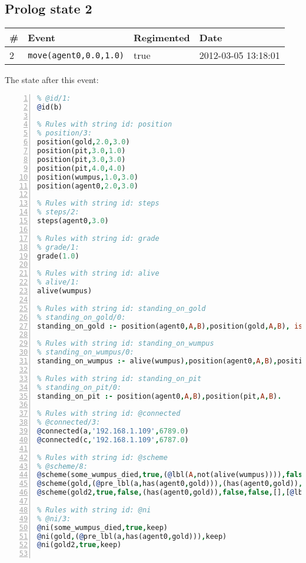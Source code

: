 \documentclass[11pt]{article}\usepackage[utf8]{inputenc}\usepackage{geometry}
\begin{document}
\subsection{Prolog state 2}
\begin{table}[ht]
\centering 
\begin{tabular}{l l l l} 
\textbf{\#} & \textbf{Event} & \textbf{Regimented} & \textbf{Date} \\ [0.5ex] 
\hline
2&\texttt{move(agent0,0.0,1.0)}&true&2012-03-05 13:18:01\\ [1ex] \hline\end{tabular}
\end{table}
The state after this event:

\lstset{breaklines=true}\begin{lstlisting}[language=Prolog, numbers=left]
% Rules with string id: @id
% @id/1:
@id(b)

% Rules with string id: position
% position/3:
position(gold,2.0,3.0)
position(pit,3.0,1.0)
position(pit,3.0,3.0)
position(pit,4.0,4.0)
position(wumpus,1.0,3.0)
position(agent0,2.0,3.0)

% Rules with string id: steps
% steps/2:
steps(agent0,3.0)

% Rules with string id: grade
% grade/1:
grade(1.0)

% Rules with string id: alive
% alive/1:
alive(wumpus)

% Rules with string id: standing_on_gold
% standing_on_gold/0:
standing_on_gold :- position(agent0,A,B),position(gold,A,B), is (C,+(A,B)),>(C,2.0).

% Rules with string id: standing_on_wumpus
% standing_on_wumpus/0:
standing_on_wumpus :- alive(wumpus),position(agent0,A,B),position(wumpus,A,B).

% Rules with string id: standing_on_pit
% standing_on_pit/0:
standing_on_pit :- position(agent0,A,B),position(pit,A,B).

% Rules with string id: @connected
% @connected/3:
@connected(a,'192.168.1.109',6789.0)
@connected(c,'192.168.1.109',6787.0)

% Rules with string id: @scheme
% @scheme/8:
@scheme(some_wumpus_died,true,(@lbl(A,not(alive(wumpus)))),false,false,false,[update(bombard_wumpus)|[]],[])
@scheme(gold,(@pre_lbl(a,has(agent0,gold))),(has(agent0,gold)),false,(@lbl(a,not(has(agent0,gold)))),false,[update(force_drop)|[]],[])
@scheme(gold2,true,false,(has(agent0,gold)),false,false,[],[@lbl(c,update(bombard_wumpus))|[]])

% Rules with string id: @ni
% @ni/3:
@ni(some_wumpus_died,true,keep)
@ni(gold,(@pre_lbl(a,has(agent0,gold))),keep)
@ni(gold2,true,keep)


\end{lstlisting}
\end{document}
